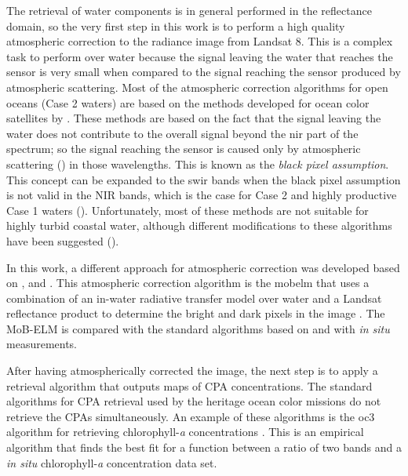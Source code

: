 The retrieval of water components is in general performed in the reflectance domain, so the very first step in this work is to perform a high quality atmospheric correction to the radiance image from Landsat 8. This is a complex task to perform over water because the signal leaving the water that reaches the sensor is very small when compared to the signal reaching the sensor produced by atmospheric scattering. Most of the atmospheric correction algorithms for open oceans (Case 2 waters) are based on the methods developed for ocean color satellites by \cite{Gordon:1994}. These methods are based on the fact that the signal leaving the water does not contribute to the overall signal beyond the \acrfull{nir} part of the spectrum; so the signal reaching the sensor is caused only by atmospheric scattering (\cite{Gordon:1994}) in those wavelengths. This is known as the {\it black pixel assumption}. This concept can be expanded to the \acrfull{swir} bands when the black pixel assumption is not valid in the NIR bands, which is the case for Case 2 and highly productive Case 1 waters (\cite{Wang:2007}). Unfortunately, most of these methods are not suitable for highly turbid coastal water, although different modifications to these algorithms have been suggested (\cite{Patt2003}).

In this work, a different approach for atmospheric correction was developed based on \cite{Raqueno:2003}, \cite{Gerace:2013} and \cite{Pahlevan:2012}. This atmospheric correction algorithm is the \acrfull{mobelm} that uses a combination of an in-water radiative transfer model over water and a Landsat reflectance product to determine the bright and dark pixels in the image \cite{Concha2014SPIE,Concha2015_SPIE}. The MoB-ELM is compared with the standard algorithms based on \cite{Gordon:1994} and with {\it in situ} measurements.

After having atmospherically corrected the image, the next step is to apply a retrieval algorithm that outputs maps of CPA concentrations. The standard algorithms for CPA retrieval used by the heritage ocean color missions do not retrieve the CPAs simultaneously. An example of these algorithms is the \acrfull{oc3} algorithm for retrieving chlorophyll-{\it a} concentrations \cite{OReilly2000}. This is an empirical algorithm that finds the best fit for a function between a ratio of two bands and a {\it in situ} chlorophyll-{\it a} concentration data set.

